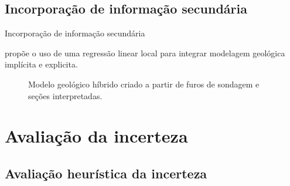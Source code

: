 \documentclass[aspectratio=169]{beamer}
\begin{document}
\subsection{Incorporação de informação secundária}

\begin{frame}{Incorporação de informação secundária}

\cite{manchuck_MLS} propõe o uso de uma regressão linear local para integrar modelagem geológica implícita e explicita.

	\begin{figure}[H]
		\caption{Modelo geológico híbrido criado a partir de furos de sondagem e seções interpretadas.}\label{mls_model}
	\end{figure}
\end{frame}

\section{Avaliação da incerteza}

\subsection{Avaliação heurística da incerteza}
\end{document}
